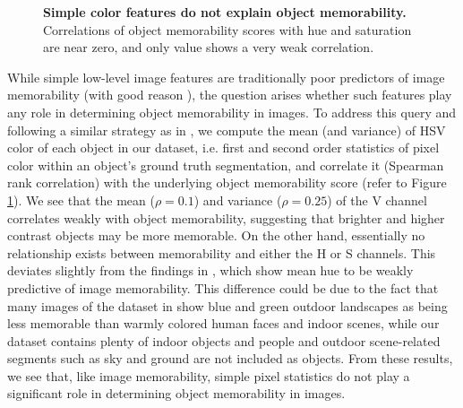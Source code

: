 \begin{figure}[b]
\centering
{}
\vspace{-5mm}\caption{\footnotesize\textbf{Simple color features do not explain object memorability.} Correlations of object memorability scores with hue and saturation are near zero, and only value shows a very weak correlation.}\label{fig:simple}
\end{figure}


While simple low-level image features are traditionally poor
predictors of image memorability \cite{isola11} (with good reason
\cite{konkle10}), the question arises whether such features play any
role in determining object memorability in images. To address this
query and following a similar strategy as in \cite{isola11,isola14},
we compute the mean (and variance) of HSV color of each object in our
dataset, i.e. first and second order  statistics of pixel color within
an object's ground truth segmentation, and correlate it (Spearman rank
correlation) with the underlying object memorability score (refer to
Figure \ref{fig:simple}). We see that the mean ($\rho = 0.1$) and
variance ($\rho=0.25$) of the V channel correlates weakly with
object memorability, suggesting that brighter and higher contrast
objects may be more memorable. On the other hand, essentially no
relationship exists between memorability and either the H or S
channels. This deviates slightly from the findings in \cite{isola11},
which show mean hue to be weakly predictive of image
memorability. This difference could be due to the fact that many
images of the dataset in \cite{isola11} show blue and green outdoor
landscapes as being less memorable than warmly colored human faces and
indoor scenes, while our dataset contains plenty of indoor objects and
people and outdoor scene-related segments such as sky and ground are
not included as objects. From these results, we see that, like image
memorability, simple pixel statistics do not play a significant role
in determining object memorability in images.

